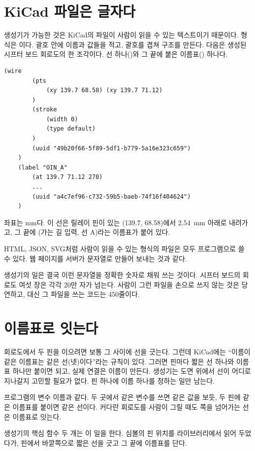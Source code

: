 \section{KiCad 파일은 글자다}\label{sec:gen-sexpr}

\Why 생성기가 가능한 것은 KiCad의 파일이 사람이 읽을 수 있는 텍스트이기 때문이다. 형식은 이다.
괄호 안에 이름과 값들을 적고, 괄호를 겹쳐 구조를 만든다. 다음은 생성된 시프터 보드 회로도의 한 조각이다.
선 하나()와 그 끝에 붙은 이름표() 하나다.

\begin{lstlisting}[numbers=none,caption={\code{stage\_1.kicad\_sch}의 일부(생성물).},label={lst:g-sexpr}]
	(wire
		(pts
			(xy 139.7 68.58) (xy 139.7 71.12)
		)
		(stroke
			(width 0)
			(type default)
		)
		(uuid "49b20f66-5f89-5df1-b779-5a16e323c659")
	)
	(label "OIN_A"
		(at 139.7 71.12 270)
		...
		(uuid "a4c7ef96-c732-59b5-baeb-74f16f404624")
	)
\end{lstlisting}

좌표는 mm다. 이 선은 릴레이 핀이 있는 (139.7, 68.58)에서 2.54~mm 아래로 내려가고, 그 끝에 (가는 길
입력, 선 A)라는 이름표가 붙어 있다.

\General HTML, JSON, SVG처럼 사람이 읽을 수 있는 형식의 파일은 모두 프로그램으로 쓸 수 있다. 웹 페이지를 서버가
문자열로 만들어 보내는 것과 같다.

\Ours 생성기의 일은 결국 이런 문자열을 정확한 숫자로 채워 쓰는 것이다. 시프터 보드의 회로도 여섯 장은 각각
20만 자가 넘는다. 사람이 그런 파일을 손으로 쓰지 않는 것은 당연하고, 대신 그 파일을 쓰는 코드는 450줄이다.

\section{이름표로 잇는다}\label{sec:gen-labels}

\Why 회로도에서 두 핀을 이으려면 보통 그 사이에 선을 긋는다. 그런데 KiCad에는 ``이름이 같은 이름표는 같은
선(넷)이다''라는 규칙이 있다. 그러면 핀마다 짧은 선 하나와 이름표 하나만 붙이면 되고, 실제 연결은 이름이
만든다. 생성기는 도면 위에서 선이 어디로 지나갈지 고민할 필요가 없다. 핀 하나에 이름 하나를 정하는 일만 남는다.

\General 프로그램의 변수 이름과 같다. 두 곳에서 같은 변수를 쓰면 같은 값을 보듯, 두 핀에 같은 이름표를 붙이면
같은 선이다. 커다란 회로도를 사람이 그릴 때도 쪽을 넘어가는 선은 이름표로 잇는다.

\Ours 생성기의 핵심 함수 두 개는 이 일을 한다. 심볼의 핀 위치를 라이브러리에서 읽어 두었다가, 핀에서 바깥쪽으로
짧은 선을 긋고 그 끝에 이름표를 단다.


